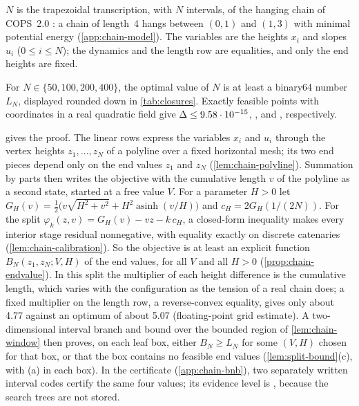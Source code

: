 $N$ is the trapezoidal transcription, with $N$ intervals, of the hanging chain of COPS~2.0 \citep{dolan2001-benchmarking-optimization-software-with-cops}: a chain of length~4 hangs between $(0,1)$ and $(1,3)$ with minimal potential energy (\cref{app:chain-model}).
The variables are the heights $x_i$ and slopes $u_i$ ($0\le i\le N$); the dynamics and the length row are equalities, and only the end heights are fixed.

\begin{theorem}\label{thm:chain-bound}
For $N\in\{50,100,200,400\}$, the optimal value of $N$ is at least a binary64 number $L_N$, displayed rounded down in \cref{tab:closures}.
Exactly feasible points with coordinates in a real quadratic field give $\Delta\le9.58\cdot 10^{-15}$, ,  and , respectively.
\end{theorem}

 gives the proof.
The linear rows express the variables $x_i$ and $u_i$ through the vertex heights $z_1,\dots,z_N$ of a polyline over a fixed horizontal mesh; its two end pieces depend only on the end values $z_1$ and $z_N$ (\cref{lem:chain-polyline}).
Summation by parts then writes the objective with the cumulative length $v$ of the polyline as a second state, started at a free value $V$.
For a parameter $H>0$ let $G_H(v)=\frac12\bigl(v\sqrt{H^2+v^2}+H^2\operatorname{asinh}(v/H)\bigr)$ and $c_H=2G_H(1/(2N))$.
For the split $\varphi_k(z,v)=G_H(v)-vz-k\,c_H$, a closed-form inequality makes every interior stage residual nonnegative, with equality exactly on discrete catenaries (\cref{lem:chain-calibration}).
So the objective is at least an explicit function $B_N(z_1,z_N;V,H)$ of the end values, for all $V$ and all $H>0$ (\cref{prop:chain-endvalue}).
In this split the multiplier of each height difference is the cumulative length, which varies with the configuration as the tension of a real chain does; a fixed multiplier on the length row, a reverse-convex equality, gives only about 4.77 against an optimum of about 5.07 (floating-point grid estimate).
A two-dimensional interval branch and bound over the bounded region of \cref{lem:chain-window} then proves, on each leaf box, either $B_N\ge L_N$ for some $(V,H)$ chosen for that box, or that the box contains no feasible end values (\cref{lem:split-bound}(c), with (a) in each box).
In the certificate (\cref{app:chain-bnb}), two separately written interval codes  certify the same four values; its evidence level is , because the search trees are not stored.

